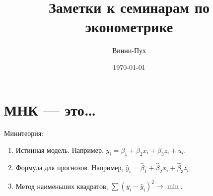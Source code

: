 \documentclass[11pt, a4paper]{article}
\title{Заметки к семинарам по эконометрике}
\author{Винни-Пух}
\date{\today}
\def \hb{\hat{\beta}}
\def \hy{\hat{y}}
\begin{document}

\section{МНК — это\ldots}

Минитеория:

\begin{enumerate}
\item Истинная модель. Например, $y_i = \beta_1 + \beta_2 x_i + \beta_3 z_i + u_i$.
\item Формула для прогнозов. Например, $\hy_i = \hb_1 + \hb_2 x_i + \hb_3 z_i$.
\item Метод наименьших квадратов, $\sum (y_i - \hy_i)^2 \to \min$.
\end{enumerate}
\end{document}
